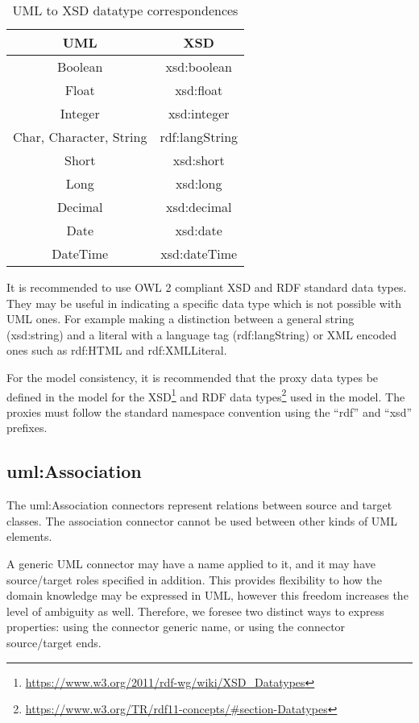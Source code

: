 	\begin{table}[!ht]
		\caption{UML to XSD datatype correspondences}
		\label{tab:uml2xsd}
		\centering
		\begin{tabular}{@{}cc@{}}
			\toprule
			UML                     & XSD         \\ \midrule
			Boolean                 & xsd:boolean \\
			Float                   & xsd:float   \\
			Integer                 & xsd:integer \\
			Char, Character, String & rdf:langString  \\
			Short                   & xsd:short   \\
			Long                    & xsd:long    \\
			Decimal                 & xsd:decimal \\
			Date                    & xsd:date    \\ 
			DateTime                & xsd:dateTime \\ \bottomrule
		\end{tabular}
	\end{table}

	It is recommended to use OWL 2 compliant XSD and RDF standard data types. They may be useful in indicating a specific data type which is not possible with UML ones. For example making a distinction between a general string (xsd:string) and a literal with a language tag (rdf:langString) or XML encoded ones such as rdf:HTML and rdf:XMLLiteral.
	
	For the model consistency, it is recommended that the proxy data types be defined in the model for the XSD\footnote{\url{https://www.w3.org/2011/rdf-wg/wiki/XSD_Datatypes}} and RDF data types\footnote{\url{https://www.w3.org/TR/rdf11-concepts/\#section-Datatypes}} used in the model. The proxies must follow the standard namespace convention using the ``rdf'' and ``xsd'' prefixes.

	\subsection{uml:Association}
	\label{sec:association}	
	
	The uml:Association connectors represent relations between source and target classes. The association connector cannot be used between other kinds of UML elements.  
	
	A generic UML connector may have a name applied to it, and it may have source/target roles specified in addition.  This provides flexibility to how the domain knowledge may be expressed in UML, however this freedom increases the level of ambiguity as well. Therefore, we foresee two distinct ways to express properties: using the connector generic name, or using the connector source/target ends. 
	

